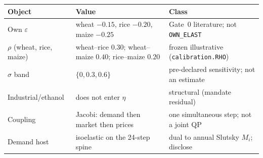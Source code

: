 \begin{tabular}{ll l}
\toprule
Object & Value & Class \\
\midrule
Own \(\varepsilon\) & wheat $-0.15$, rice $-0.20$, maize $-0.25$
  & Gate~0 literature; not \texttt{OWN\_ELAST} \\
\(\rho\) (wheat, rice, maize)
  & wheat--rice $0.30$; wheat--maize $0.40$; rice--maize $0.20$
  & frozen illustrative (\texttt{calibration.RHO}) \\
\(\sigma\) band & \(\{0,0.3,0.6\}\)
  & pre-declared sensitivity; not an estimate \\
Industrial/ethanol & does not enter \(\eta\)
  & structural (mandate residual) \\
Coupling & Jacobi: demand then market then prices
  & one simultaneous step; not a joint QP \\
Demand host & isoelastic on the 24-step spine
  & dual to annual Slutsky \(M_i\); disclose \\
\bottomrule
\end{tabular}

